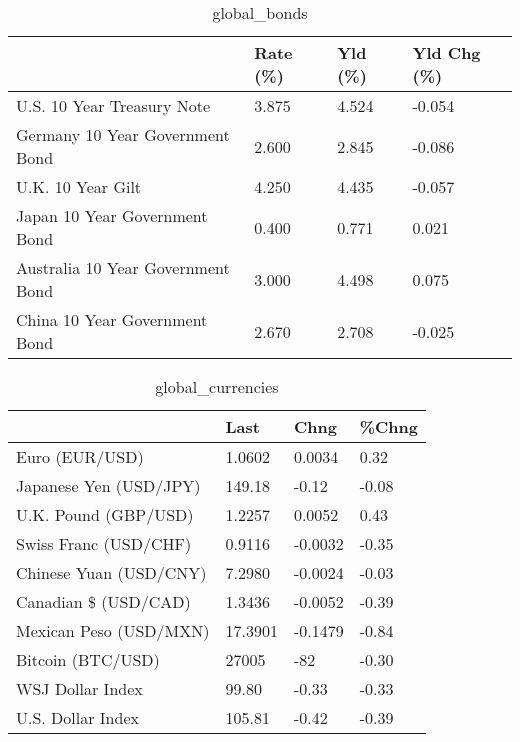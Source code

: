 \documentclass{article}%
\begin{document}
%


\begin{table}[htbp]%
\caption{global\_bonds}%
\centering%
\begin{adjustbox}{width=1\textwidth}%
\begin{tabular}{llll}
\toprule
                                  & Rate (\%) & Yld (\%) & Yld Chg (\%) \\
\midrule
       U.S. 10 Year Treasury Note &    3.875 &   4.524 &      -0.054 \\
  Germany 10 Year Government Bond &    2.600 &   2.845 &      -0.086 \\
                U.K. 10 Year Gilt &    4.250 &   4.435 &      -0.057 \\
    Japan 10 Year Government Bond &    0.400 &   0.771 &       0.021 \\
Australia 10 Year Government Bond &    3.000 &   4.498 &       0.075 \\
    China 10 Year Government Bond &    2.670 &   2.708 &      -0.025 \\
\bottomrule
\end{tabular}
%
\end{adjustbox}%
\end{table}

%


\begin{table}[htbp]%
\caption{global\_currencies}%
\centering%
\begin{adjustbox}{width=1\textwidth}%
\begin{tabular}{llll}
\toprule
                       &    Last &    Chng & \%Chng \\
\midrule
        Euro (EUR/USD) &  1.0602 &  0.0034 &  0.32 \\
Japanese Yen (USD/JPY) &  149.18 &   -0.12 & -0.08 \\
  U.K. Pound (GBP/USD) &  1.2257 &  0.0052 &  0.43 \\
 Swiss Franc (USD/CHF) &  0.9116 & -0.0032 & -0.35 \\
Chinese Yuan (USD/CNY) &  7.2980 & -0.0024 & -0.03 \\
  Canadian \$ (USD/CAD) &  1.3436 & -0.0052 & -0.39 \\
Mexican Peso (USD/MXN) & 17.3901 & -0.1479 & -0.84 \\
     Bitcoin (BTC/USD) &   27005 &     -82 & -0.30 \\
      WSJ Dollar Index &   99.80 &   -0.33 & -0.33 \\
     U.S. Dollar Index &  105.81 &   -0.42 & -0.39 \\
\bottomrule
\end{tabular}
%
\end{adjustbox}%
\end{table}
\end{document}
